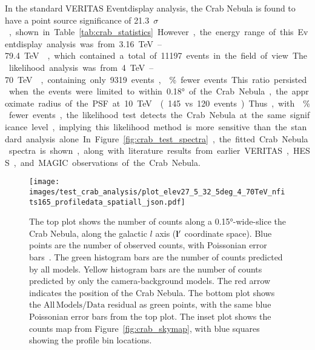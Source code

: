   In the standard VERITAS Eventdisplay analysis, the Crab Nebula is found to have a point source significance of \SI{21.3}{$\sigma$}, shown in Table~\ref{tab:crab_statistics}.
  However, the energy range of this Eventdisplay analysis was from \SIrange{3.16}{79.4}{\TeV{}}, which contained a total of 11197 events in the field of view.
  The likelihood analysis was from \SIrange{4}{70}{\TeV{}}, containing only 9319 events, \% fewer events.
  This ratio persisted when the events were limited to within \ang{0.18} of the Crab Nebula, the approximate radius of the PSF at \SI{10}{\TeV{}} (145 vs 120 events).
  Thus, with \% fewer events, the likelihood test detects the Crab Nebula at the same significance level, implying this likelihood method is more sensitive than the standard analysis alone.
  In Figure~\ref{fig:crab_test_spectra}, the fitted Crab Nebula spectra is shown, along with literature results from earlier VERITAS, HESS, and MAGIC observations of the Crab Nebula.
  
  \begin{figure}[p]
    \centering
    \texttt{[image: images/test\_crab\_analysis/plot\_elev27\_5\_32\_5deg\_4\_70TeV\_nfits165\_profiledata\_spatiall\_json.pdf]}
    \caption[Crab Nebula Profile along Galactic $l$]
    {
      The top plot shows the number of counts along a \ang{0.15}-wide-slice the Crab Nebula, along the galactic $l$ axis ($\mathbf{l'}$ coordinate space).
      Blue points are the number of observed counts, with Poissonian error bars~\cite{poissonfrequentistinterval}.
      The green histogram bars are the number of counts predicted by all models.
      Yellow histogram bars are the number of counts predicted by only the camera-background models.
      The red arrow indicates the position of the Crab Nebula.
      The bottom plot shows the $\mathrm{All\,Models}/\mathrm{Data}$ residual as green points, with the same blue Poissonian error bars from the top plot.
      The inset plot shows the counts map from Figure~\ref{fig:crab_skymap}, with blue squares showing the profile bin locations.
    }
    \label{fig:crab_profile_l}
  \end{figure}

